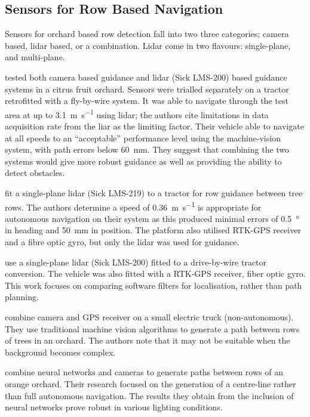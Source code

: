 \documentclass[preprint,authoryear,12pt]{elsarticle}
\begin{document}
    \subsection{Sensors for Row Based Navigation}

        Sensors for orchard based row detection fall into two three categories; camera based, lidar based, or a combination.
        Lidar come in two flavours: single-plane, and multi-plane.

        \cite{Subramanian2006} tested both camera based guidance and lidar (Sick LMS-200) based guidance systems in a citrus fruit orchard.
        Sensors were trialled separately on a tractor retrofitted with a fly-by-wire system.
        It was able to navigate through the test area at up to \SI{3.1}{\meter\per\second} using lidar; the authors cite limitations in data acquisition rate from the liar as the limiting factor.
        Their vehicle able to navigate at all speeds to an ``acceptable'' performance level using the machine-vision system, with path errors below \SI{60}{\milli\meter}.
        They suggest that combining the two systems would give more robust guidance as well as providing the ability to detect obstacles.

        \cite{Barawid2007} fit a single-plane lidar (Sick LMS-219) to a tractor for row guidance between tree rows.
        The authors determine a speed of \SI{0.36}{\meter\per\second} is appropriate for autonomous navigation on their system as this produced minimal errors of \SI{0.5}{\degree} in heading and \SI{50}{\milli\meter} in position.
        The platform also utilised RTK-GPS receiver and a fibre optic gyro, but only the lidar was used for guidance.

        \cite{Hansen2011} use a single-plane lidar (Sick LMS-200) fitted to a drive-by-wire tractor conversion.
        The vehicle was also fitted with a RTK-GPS receiver, fiber optic gyro.
        This work focuses on comparing software filters for localisation, rather than path planning.

        \cite{He2011} combine camera and GPS receiver on a small electric truck (non-autonomous).
        They use traditional machine vision algorithms to generate a path between rows of trees in an orchard.
        The authors note that it may not be suitable when the background becomes complex.

        \cite{Torres2011} combine neural networks and cameras to generate paths between rows of an orange orchard.
        Their research focused on the generation of a centre-line rather than full autonomous navigation.
        The results they obtain from the inclusion of neural networks prove robust in various lighting conditions.
\end{document}

